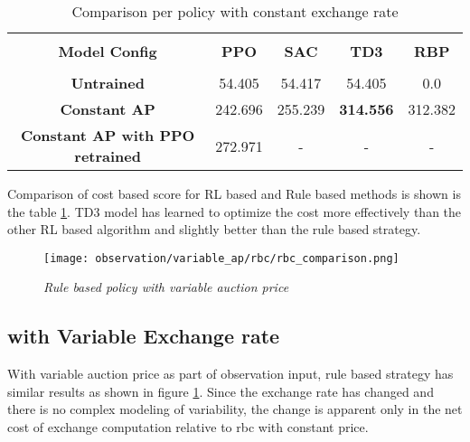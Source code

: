 \begin{large}
\begin{table}
	\begin{center}
		\begin{tabular}{ccccc} 
			\hline %
			\vspace{0.5pt} \\
			\textbf{Model Config} & \textbf{PPO} & \textbf{SAC} & \textbf{TD3} & \textbf{RBP} \\ %
			\hline %
			\vspace{0.5pt} \\
			\textbf{Untrained} & 54.405 & 54.417  & 54.405 & 0.0 \\
			\textbf{Constant AP} & 242.696 & 255.239  & \textbf{314.556}  & 312.382 \\
			\textbf{Constant AP with PPO retrained} & 272.971 & -  & -  & - \\
			\hline %
		\end{tabular}
		\caption{Comparison per policy with constant exchange rate }
		\label{table:comparison_constant_ap} %
	\end{center}
\end{table}

Comparison of cost based score for RL based and Rule based methods is shown is the table \ref{table:comparison_constant_ap}. TD3 model has learned to optimize the cost more effectively than the other RL based algorithm and slightly better than the rule based strategy. \\  

\begin{figure}[h]
	\begin{center}
		\texttt{[image: observation/variable\_ap/rbc/rbc\_comparison.png]}
		\caption{ \textit{Rule based policy with variable auction price} }
		\label{fig:test_compare_variable_ap_rbc}
	\end{center}
\end{figure}

\subsection*{with Variable Exchange rate}

With variable auction price as part of observation input, rule based strategy has similar results as shown in figure \ref{fig:test_compare_variable_ap_rbc}. Since the exchange rate has changed and there is no complex modeling of variability, the change is apparent only in the net cost of exchange computation relative to rbc with constant price. \\ 


\end{large}
